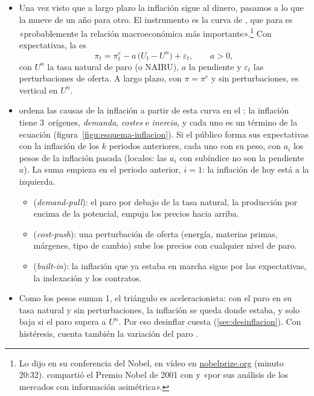 \documentclass[11pt]{article}
\begin{document}
\begin{itemize}
\item Una vez visto que a largo plazo la inflación sigue al dinero, pasamos a lo que la mueve de un año para otro. El instrumento es la curva de , que para \textcite{Akerlof2002Behavioral} es «probablemente la relación macroeconómica más importante».\footnote{Lo dijo en su conferencia del Nobel, en vídeo en \href{https://www.nobelprize.org/prizes/economic-sciences/2001/akerlof/lecture/}{nobelprize.org} (minuto 20:32).  compartió el Premio Nobel de 2001 con  y  «por sus análisis de los mercados con información asimétrica»\nocite{Nobel2001AkerlofSpenceStiglitz}.} Con expectativas, la  es 
  \begin{equation}\label{eq:phillips-aumentada}
  \pi_t=\pi^e_t-a\,\big(U_t-U^n\big)+\varepsilon_t,\qquad a>0,
  \end{equation}
  con $U^n$ la tasa natural de paro (o NAIRU), $a$ la pendiente y $\varepsilon_t$ las perturbaciones de oferta. A largo plazo, con $\pi=\pi^e$ y sin perturbaciones, es vertical en $U^n$.
\item \textcite{Gordon1982Price} ordena las causas de la inflación a partir de esta curva en el \nocite{Gordon1977Can,Gordon1997Time,Gordon2011Phillips}: la inflación tiene 3~orígenes, \emph{demanda}, \emph{costes} e \emph{inercia}, y cada uno es un término de la ecuación (figura~\ref{figu:esquema-inflacion}). Si el público forma sus expectativas con la inflación de los $k$ periodos anteriores, cada uno con su peso,
  con $a_i$ los pesos de la inflación pasada (locales: las $a_i$ con subíndice no son la pendiente $a$). La suma empieza en el periodo anterior, $i=1$: la inflación de hoy está a la izquierda.
  \begin{itemize}
  \item {} (\emph{demand-pull}): el paro por debajo de la tasa natural, la producción por encima de la potencial, empuja los precios hacia arriba.
  \item {} (\emph{cost-push}): una perturbación de oferta (energía, materias primas, márgenes, tipo de cambio) sube los precios con cualquier nivel de paro.
  \item {} (\emph{built-in}): la inflación que ya estaba en marcha sigue por las expectativas, la indexación y los contratos.
  \end{itemize}
\item Como los pesos suman 1, el triángulo es aceleracionista: con el paro en su tasa natural y sin perturbaciones, la inflación se queda donde estaba, y solo baja si el paro supera a $U^n$. Por eso desinflar cuesta (\ref{sec:desinflacion}). Con histéresis, cuenta también la variación del paro .
\end{itemize}
\end{document}
